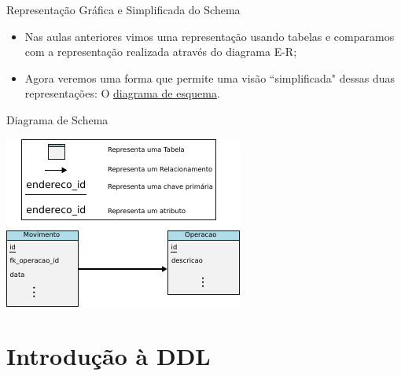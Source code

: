 \documentclass[xcolor=x11names,compress]{beamer}
\begin{document}
\begin{frame}{Representação Gráfica e Simplificada do Schema}

\begin{itemize}
\itemsep 5mm

\item Nas aulas anteriores vimos uma representação usando tabelas e comparamos com a representação realizada através do diagrama E-R;

\item Agora veremos uma forma que permite uma visão ``simplificada" dessas duas representações: O \underline{diagrama de esquema}.

\end{itemize}

\end{frame}

\begin{frame}{Diagrama de Schema}

\centering \includegraphics[keepaspectratio, width=.8\textwidth]{schema_diagram}


\end{frame}

\section{Introdução à DDL}
\end{document}
